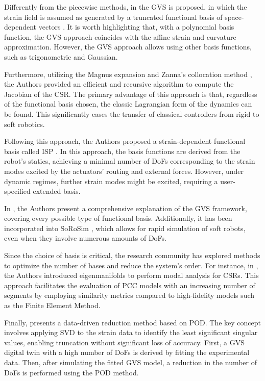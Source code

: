 Differently from the piecewise methods, in \cite{renda2020geometric, boyer2020dynamics} the \ac{GVS} is proposed, in which the strain field is assumed as generated by a truncated functional basis of space-dependent vectors \cite{armanini2023soft}. It is worth highlighting that, with a polynomial basis function, the \ac{GVS} approach coincides with the affine strain and curvature approximation. However, the \ac{GVS} approach allows using other basis functions, such as trigonometric and Gaussian.

Furthermore, utilizing the Magnus expansion \cite[Chap. IV.7]{hairergeometric} and Zanna's collocation method \cite{zanna1999collocation}, the Authors provided an efficient and recursive algorithm to compute the Jacobian of the \ac{CSR}. 
The primary advantage of this approach is that, regardless of the functional basis chosen, the classic Lagrangian form \cite{siciliano} of the dynamics can be found.
This significantly eases the transfer of classical controllers from rigid to soft robotics.

 Following this approach, the Authors proposed a strain-dependent functional basis called \ac{ISP} \cite{renda2024dynamics}. In this approach, the basis functions are derived from the robot's statics, achieving a minimal number of \ac{DoFs} corresponding to the strain modes excited by the actuators’ routing and external forces. However, under dynamic regimes, further strain modes might be excited, requiring a user-specified extended basis.

In \cite{mathew2024reduced}, the Authors present a comprehensive explanation of the \ac{GVS} framework, covering every possible type of functional basis. 
Additionally, it has been incorporated into \ac{SoRoSim} \cite{mathew2022sorosim}, which allows for rapid simulation of soft robots, even when they involve numerous amounts of \ac{DoFs}.

Since the choice of basis is critical, the research community has explored methods to optimize the number of bases and reduce the system's order.
For instance, in \cite{pustina2024nonlinear}, the Authors introduced eigenmanifolds to perform modal analysis for \acp{CSR}. This approach facilitates the evaluation of \ac{PCC} models with an increasing number of segments by employing similarity metrics compared to high-fidelity models such as the Finite Element Method.

Finally, \cite{alkayas2024soft} presents a data-driven reduction method based on \ac{POD}. The key concept involves applying \ac{SVD} to the strain data to identify the least significant singular values, enabling truncation without significant loss of accuracy. 
First, a \ac{GVS} digital twin with a high number of \ac{DoFs} is derived by fitting the experimental data. Then, after simulating the fitted \ac{GVS} model, a reduction in the number of \ac{DoFs} is performed using the \ac{POD} method.


